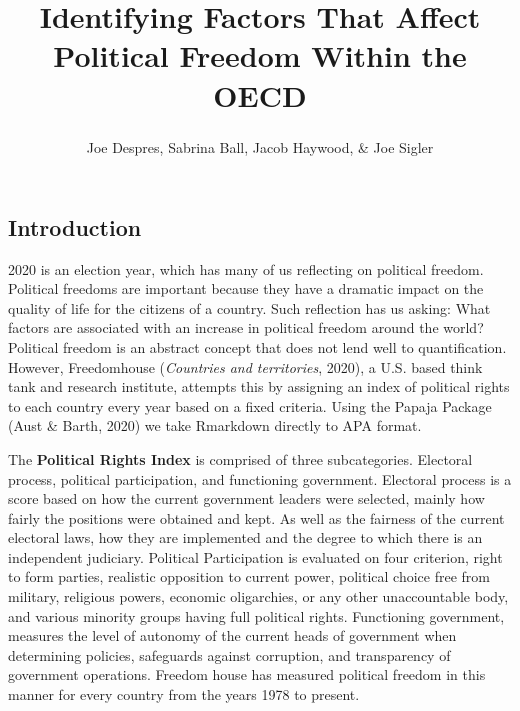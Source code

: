\documentclass[
  english,
  man,floatsintext]{apa6}
\title{Identifying Factors That Affect Political Freedom Within the OECD}
\author{Joe Despres\textsuperscript{}, Sabrina Ball\textsuperscript{}, Jacob Haywood\textsuperscript{}, \& Joe Sigler\textsuperscript{}}
\date{}
\affiliation{\vspace{0.5cm}\textsuperscript{} Michigan State University\\
November 30, 2020}
\begin{document}
\maketitle

\hypertarget{introduction}{%
\subsection{Introduction}\label{introduction}}

2020 is an election year, which has many of us reflecting on political freedom. Political freedoms are important because they have a dramatic impact on the quality of life for the citizens of a country. Such reflection has us asking: What factors are associated with an increase in political freedom around the world? Political freedom is an abstract concept that does not lend well to quantification. However, Freedomhouse (\emph{Countries and territories}, 2020), a U.S. based think tank and research institute, attempts this by assigning an index of political rights to each country every year based on a fixed criteria. Using the Papaja Package (Aust \& Barth, 2020) we take Rmarkdown directly to APA format.

The \textbf{Political Rights Index} is comprised of three subcategories. Electoral process, political participation, and functioning government. Electoral process is a score based on how the current government leaders were selected, mainly how fairly the positions were obtained and kept. As well as the fairness of the current electoral laws, how they are implemented and the degree to which there is an independent judiciary. Political Participation is evaluated on four criterion, right to form parties, realistic opposition to current power, political choice free from military, religious powers, economic oligarchies, or any other unaccountable body, and various minority groups having full political rights. Functioning government, measures the level of autonomy of the current heads of government when determining policies, safeguards against corruption, and transparency of government operations. Freedom house has measured political freedom in this manner for every country from the years 1978 to present.
\end{document}
